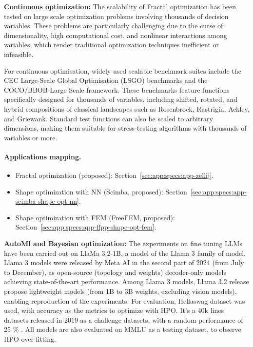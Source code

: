 {\bf Continuous optimization:} The scalability of Fractal optimization has been tested on large scale optimization problems involving thousands of decision variables. These problems are particularly challenging due to the curse of dimensionality, high computational cost, and nonlinear interactions among variables, which render traditional optimization techniques inefficient or infeasible.

For continuous optimisation, widely used scalable benchmark suites include the CEC Large-Scale Global Optimisation (LSGO) benchmarks and the COCO/BBOB-Large Scale framework. These benchmarks feature functions specifically designed for thousands of variables, including shifted, rotated, and hybrid compositions of classical landscapes such as Rosenbrock, Rastrigin, Ackley, and Griewank. Standard test functions can also be scaled to arbitrary dimensions, making them suitable for stress-testing algorithms with thousands of variables or more.

\paragraph{Applications mapping.}
\begin{itemize}
	\item Fractal optimization (proposed): Section~\ref{sec:app:specs:app-zellij}.
	\item Shape optimization with NN (Scimba, proposed): Section~\ref{sec:app:specs:app-scimba-shape-opt-nn}.
	\item Shape optimization with FEM (FreeFEM, proposed): Section~\ref{sec:app:specs:app-ffpp-shape-opt-fem}.
\end{itemize}

\medskip

{\bf AutoMl and Bayesian optimization:} The experiments on fine tuning LLMs have been carried out on LlaMa 3.2-1B, a model of the Llama 3 family of model. Llama 3 models were released by Meta AI in the second part of 2024 (from July to December), as open-source (topology and weights) decoder-only models achieving state-of-the-art performance. Among Llama 3 models, Llama 3.2 release propose lightweight models (from 1B to 3B weights, excluding vision models), enabling reproduction of the experiments. For evaluation, Hellaswag dataset was used, with accuracy as the metrics to optimize with HPO. It's a 40k lines datasets released in 2019 as a challenge datasets, with a random performance of 25 \% . All models are also evaluated on MMLU as a testing dataset, to observe HPO over-fitting. 

